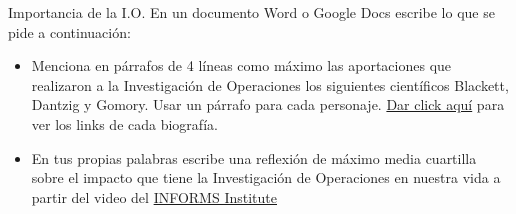 \begin{frameact}{Importancia de la  I.O.}
  En un documento Word o Google Docs escribe lo que se pide a continuación:

  \begin{itemize} \justifying  \parskip3mm
  \item Menciona en párrafos de 4 líneas como máximo las aportaciones que realizaron a la Investigación de Operaciones los siguientes científicos Blackett, Dantzig y Gomory. Usar un párrafo para cada personaje.   \hyperlink{slide:or-dates}{Dar click aquí}  para ver los links de cada biografía. %

  \item En tus propias palabras escribe una reflexión de máximo media cuartilla sobre el impacto que tiene la Investigación de Operaciones en nuestra vida a partir del video del \href{https://www.youtube.com/watch?v=sFWrmpXPVJw}{INFORMS Institute}
  \end{itemize}
\end{frameact}


